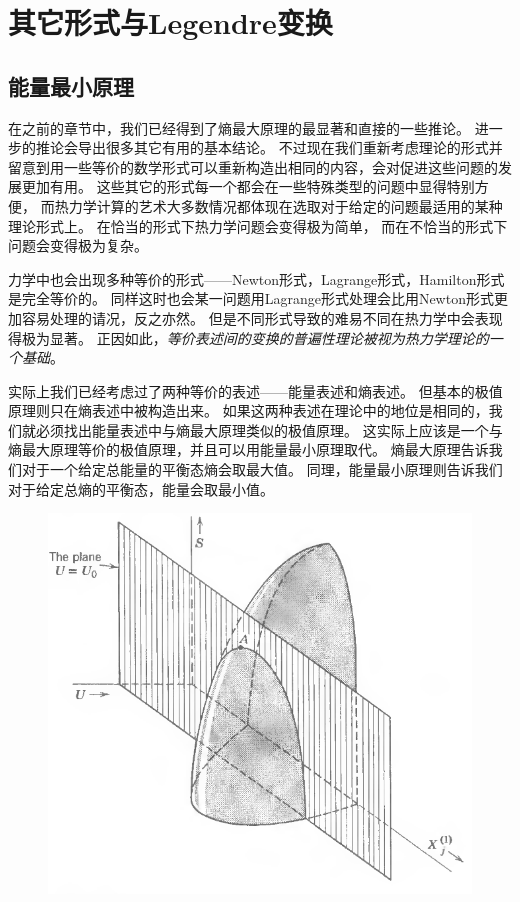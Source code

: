 \chapter{其它形式与Legendre变换}
\label{chap5}

\section{能量最小原理}
\label{sec5.1}

在之前的章节中，我们已经得到了熵最大原理的最显著和直接的一些推论。
进一步的推论会导出很多其它有用的基本结论。
不过现在我们重新考虑理论的形式并留意到用一些等价的数学形式可以重新构造出相同的内容，会对促进这些问题的发展更加有用。
这些其它的形式每一个都会在一些特殊类型的问题中显得特别方便，
而热力学计算的艺术大多数情况都体现在选取对于给定的问题最适用的某种理论形式上。
在恰当的形式下热力学问题会变得极为简单，
而在不恰当的形式下问题会变得极为复杂。

力学中也会出现多种等价的形式——Newton形式，Lagrange形式，Hamilton形式是完全等价的。
同样这时也会某一问题用Lagrange形式处理会比用Newton形式更加容易处理的请况，反之亦然。
但是不同形式导致的难易不同在热力学中会表现得极为显著。
正因如此，{\it 等价表述间的变换的普遍性理论被视为热力学理论的一个基础}。

实际上我们已经考虑过了两种等价的表述——能量表述和熵表述。
但基本的极值原理则只在熵表述中被构造出来。
如果这两种表述在理论中的地位是相同的，我们就必须找出能量表述中与熵最大原理类似的极值原理。
这实际上应该是一个与熵最大原理等价的极值原理，并且可以用能量最小原理取代。
熵最大原理告诉我们对于一个给定总能量的平衡态熵会取最大值。
同理，能量最小原理则告诉我们对于给定总熵的平衡态，能量会取最小值。

\begin{figure}[htbp]
\includegraphics[width=\textwidth]{Pictures/fig5.1.png}
\label{fig5.1}
\end{figure}

